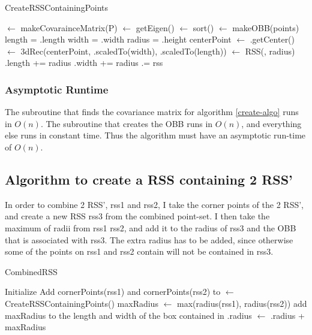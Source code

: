 \begin{algorithm}[H]
  \caption{CreateRSSContainingPoints}
  \label{create-algo}
   
  \dontprintsemicolon
  \covar $\gets$ makeCovarainceMatrix(P)\;
  \eigen $\gets$ getEigen(\covar) \;
  \eigen $\gets$ sort(\eigen) \;
  \obox $\gets$ makeOBB(points) \;
  length = \obox.length\;
  width = \obox.width\;
  radius = \obox.height \;
  centerPoint $\gets$ \obox.getCenter() \;
  \threedeeRec $\gets$ 3dRec(centerPoint, \eigen[1].scaledTo(width), \eigen[0].scaledTo(length)) \;
  \rss $\gets$ RSS(\threedeeRec, radius) \;
  \obox.length += radius \;
  \obox.width += radius \;
  \rss.\obox = \obox \;
  \return rss
\end{algorithm}

\subsubsection{Asymptotic Runtime}
The subroutine that finds the covariance matrix for algorithm \ref{create-algo} runs in $O(n)$. The subroutine that creates the OBB runs in $O(n)$, and everything else runs in constant time. Thus the algorithm must have an asymptotic run-time of $O(n)$.

\subsection{Algorithm to create a RSS containing 2 RSS'}
In order to combine  2 RSS', rss1 and rss2, I take the corner points of the 2 RSS', and create a new RSS rss3 from the combined point-set. I then take the maximum of radii from rss1 rss2, and add it to the radius of rss3 and the OBB that is associated with rss3. The extra radius has to be added, since otherwise some of the points on rss1 and rss2 contain will not be contained in rss3. 

\begin{algorithm}[H]
  \caption{CombinedRSS}
  \label{combine-algo}
   
  \dontprintsemicolon
  Initialize \points \;
  Add cornerPoints(rss1) and cornerPoints(rss2) to \points \;
  \crss $\gets$ CreateRSSContainingPoints(\points) \;
  maxRadius $\gets$ max(radius(rss1), radius(rss2)) \;
  add maxRadius to the length and width of the box contained in \crss\;
  \crss.radius $\gets$ \crss.radius + maxRadius \;
  \return \crss \;
\end{algorithm}

